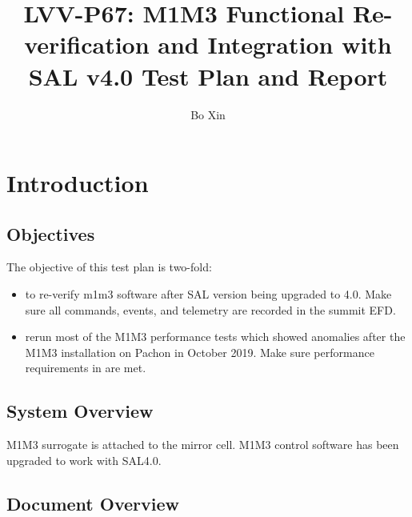 \documentclass[SE,lsstdraft,STR,toc]{lsstdoc}
\providecommand{\tightlist}{
  \setlength{\itemsep}{0pt}\setlength{\parskip}{0pt}}
\begin{document}
\def\milestoneName{M1M3 Functional Re-verification and Integration with SAL v4.0}
\def\milestoneId{LVV-P67}
\def\product{SIT-COM Integration}


\title{LVV-P67: M1M3 Functional Re-verification and Integration with SAL v4.0 Test Plan and Report}
\setDocRef{\lsstDocType-\lsstDocNum}
\date{\vcsdate}
\author{ Bo Xin }






\maketitle

\section{Introduction}
\label{sect:intro}


\subsection{Objectives}
\label{sect:objectives}

 The objective of this test plan is two-fold:

\begin{itemize}
\tightlist
\item
  to re-verify m1m3 software after SAL version being upgraded to 4.0.
  Make sure all commands, events, and telemetry are recorded in the
  summit EFD.
\item
  rerun most of the M1M3 performance tests which showed anomalies after
  the M1M3 {installation on Pachon in October 2019. Make sure
  performance requirements in  are met.}
\end{itemize}


\subsection{System Overview}
\label{sect:systemoverview}

 M1M3 surrogate is attached to the mirror cell. M1M3 control software has
been upgraded to work with SAL4.0.


\subsection{Document Overview}
\label{sect:docoverview}
\end{document}
